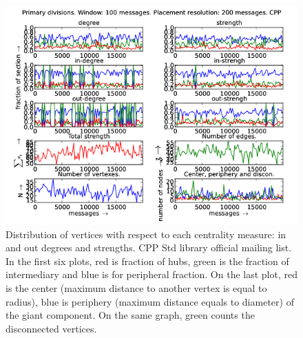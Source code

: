\documentclass[%
 aip,
 jmp,%
 amsmath,amssymb,
 reprint,%
]{revtex4-1}
\begin{document}
\begin{figure}[hbtp] 
   \centering
        \includegraphics[width=\textwidth]{figs/CPP/100}
    \caption{Distribution of vertices with respect to each centrality measure: in and out degrees and strengths. CPP Std library official mailing list. In the first six plots, red is fraction of hubs, green is the fraction of intermediary and blue is for peripheral fraction. On the last plot, red is the center (maximum distance to another vertex is equal to radius), blue is periphery (maximum distance equals to diameter) of the giant component. On the same graph, green counts the disconnected vertices.}
    \label{fig:cpp100}
\end{figure}
\end{document}
